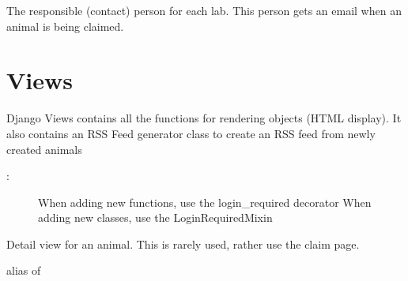 \documentclass[letterpaper,10pt,openany,oneside,english]{sphinxmanual}
\begin{document}
\begin{fulllineitems}
\label{\detokenize{index:animals.models.Person}}
The responsible (contact) person for each lab.
This person gets an email when an animal is being claimed.

\begin{fulllineitems}
\label{\detokenize{index:animals.models.Person.DoesNotExist}}
\end{fulllineitems}


\begin{fulllineitems}
\label{\detokenize{index:animals.models.Person.MultipleObjectsReturned}}
\end{fulllineitems}


\end{fulllineitems}



\section{Views}
\label{\detokenize{index:module-animals.views}}\label{\detokenize{index:views}}
Django Views contains all the functions for rendering objects (HTML display).
It also contains an RSS Feed generator class to create an RSS feed from newly created animals
\begin{description}
\item[{:}] \leavevmode
When adding new functions, use the login\_required decorator
When adding new classes, use the LoginRequiredMixin

\end{description}

\begin{fulllineitems}
\label{\detokenize{index:animals.views.AnimalDetailView}}
Detail view for an animal.
This is rarely used, rather use the claim page.

\begin{fulllineitems}
\label{\detokenize{index:animals.views.AnimalDetailView.model}}
alias of {\hyperref[\detokenize{index:animals.models.Animal}]{}}

\end{fulllineitems}


\end{fulllineitems}
\end{document}
